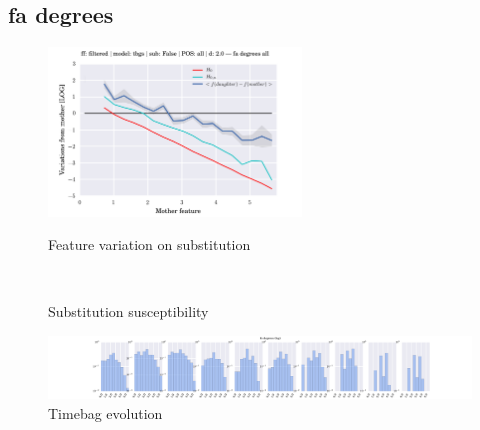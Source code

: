 \subsection{fa degrees}
\begin{figure}[h!]
    \centering
    \includegraphics[width=0.6\textwidth]{images/feature-cards/fa_degrees/feature_variations.png}
    \caption{Feature variation on substitution}
	~
	\caption{Substitution susceptibility}
    \includegraphics[width=\textwidth]{images/feature-cards/fa_degrees/timebags_evolution-hist.png}
	\caption{Timebag evolution}
\end{figure}


\clearpage
